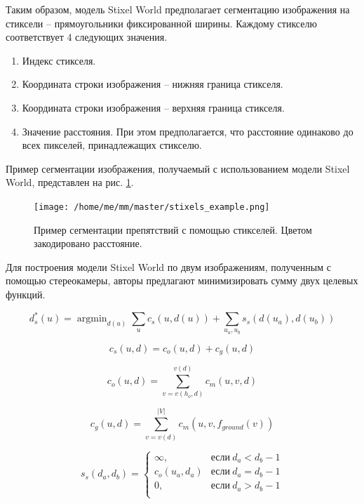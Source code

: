 \documentclass[aps,%
14pt,%
final,%
oneside,
onecolumn,%
musixtex, %
superscriptaddress,%
centertags]{extarticle} %
\DeclareMathOperator*{\argmin}{argmin}
\begin{document}
Таким образом, модель Stixel World предполагает сегментацию изображения на стиксели -- прямоугольники фиксированной ширины. Каждому стикселю соответствует 4 следующих значения.
\begin{enumerate}
\item Индекс стикселя.
\item Координата строки изображения -- нижняя граница стикселя. 
\item Координата строки изображения -- верхняя граница стикселя.
\item Значение расстояния. При этом предполагается, что расстояние одинаково до всех пикселей, принадлежащих стикселю.
\end{enumerate}

Пример сегментации изображения, получаемый с использованием модели Stixel World, представлен на рис. \ref{stixels_segm}.

\begin{figure}[htp]
\centering
\texttt{[image: /home/me/mm/master/stixels\_example.png]}
\caption{Пример сегментации препятствий с помощью стикселей. Цветом закодировано расстояние.}
\label{stixels_segm}
\end{figure}

Для построения модели Stixel World по двум изображениям, полученным с помощью стереокамеры, авторы предлагают минимизировать сумму двух целевых функций.

\begin{equation}\label{eq:stix_basic}
d^*_s(u) = \argmin_{d(u)}\sum_u c_s(u, d(u)) + \sum_{u_a, u_b} s_s(d(u_a), d(u_b))
\end{equation}

\begin{equation}
c_s(u, d) = c_o(u, d) + c_g(u, d)
\end{equation}

\begin{equation}\label{eq:stix_co}
c_o(u, d) = \sum_{v=v(h_o, d)}^{v(d)} c_m(u, v, d)
\end{equation}

\begin{equation}\label{eq:stix_cg}
c_g(u, d) = \sum_{v=v(d)}^{|V|} c_m(u, v, f_{ground}(v))
\end{equation}

\begin{equation}\label{eq:stix_ss}
s_s(d_a, d_b)=
\begin{cases}
  \infty, & \text{если}\ d_a < d_b - 1 \\
  c_o(u_a, d_a) & \text{если}\ d_a = d_b - 1 \\
  0, & \text{если}\ d_a > d_b - 1 \\
\end{cases}
\end{equation}
\end{document}
